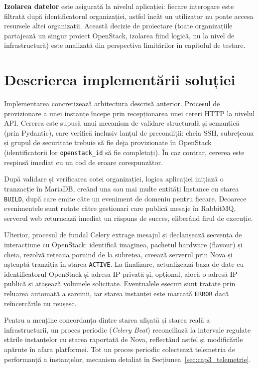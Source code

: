 \textbf{Izolarea datelor} este asigurată la nivelul aplicației: fiecare interogare este filtrată după identificatorul organizației, astfel încât un utilizator nu poate accesa resursele altei organizații. Această decizie de proiectare (toate organizațiile partajează un singur proiect OpenStack, izolarea fiind logică, nu la nivel de infrastructură) este analizată din perspectiva limitărilor în capitolul de testare.

\section{Descrierea implementării soluției}
\label{sec:cap3_implementare}

Implementarea concretizează arhitectura descrisă anterior. Procesul de provizionare a unei instanțe începe prin recepționarea unei cereri HTTP la nivelul API. Cererea este supusă unui mecanism de validare structurală și semantică (prin Pydantic), care verifică inclusiv lanțul de precondiții: cheia SSH, subrețeaua și grupul de securitate trebuie să fie deja provizionate în OpenStack (identificatorii lor \texttt{openstack\_id} să fie completați). În caz contrar, cererea este respinsă imediat cu un cod de eroare corespunzător.

După validare și verificarea cotei organizației, logica aplicației inițiază o tranzacție în MariaDB, creând una sau mai multe entități Instance cu starea \texttt{BUILD}, după care emite câte un eveniment de domeniu pentru fiecare. Deoarece evenimentele sunt rutate către gestionari care publică mesaje în RabbitMQ, serverul web returnează imediat un răspuns de succes, eliberând firul de execuție.

Ulterior, procesul de fundal Celery extrage mesajul și declanșează secvența de interacțiune cu OpenStack: identifică imaginea, pachetul hardware (flavour) și cheia, rezolvă rețeaua pornind de la subrețea, creează serverul prin Nova și așteaptă tranziția în starea \texttt{ACTIVE}. La finalizare, actualizează baza de date cu identificatorul OpenStack și adresa IP privată și, opțional, alocă o adresă IP publică și atașează volumele solicitate. Eventualele eșecuri sunt tratate prin reluarea automată a sarcinii, iar starea instanței este marcată \texttt{ERROR} dacă reîncercările nu reușesc.

Pentru a menține concordanța dintre starea afișată și starea reală a infrastructurii, un proces periodic (\textit{Celery Beat}) reconciliază la intervale regulate stările instanțelor cu starea raportată de Nova, reflectând astfel și modificările apărute în afara platformei. Tot un proces periodic colectează telemetria de performanță a instanțelor, mecanism detaliat în Secțiunea~\ref{sec:cap3_telemetrie}.

